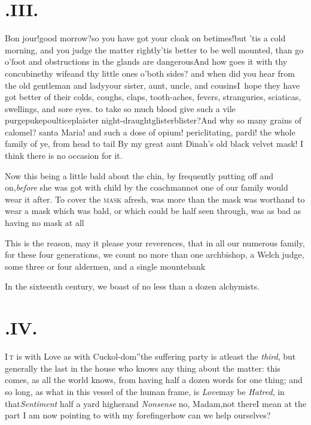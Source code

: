 \documentclass{article}
\begin{document}
\section{.\enspace III.}

\noindent\quad
\tsh Bon jour!\tsh good
morrow?\break\tsh so you have got your cloak on
betimes!\tsh but ’tis a cold morning, and you judge
the matter rightly\tsh ’tis better to be well
mounted, than go \hbox{o’\thinspace foot}\break
\tsh and obstructions in the
glands are dangerous\tsh And how goes it with thy
concubine\tsk thy wife\tsk and thy little ones o’\thinspace both
sides? and when did you hear from the old gentleman and
lady\tsk your sister, aunt, uncle, and cousins\tsk I~hope 
they have got better of their colds, coughs, claps,
tooth-aches, fevers, stranguries, sciaticas, swellings, and sore
eyes.
 to take so much blood\tsk
give such a vile purge\tsk puke\tsk poultice\tsk plaister\tsk
night-draught\tsk glister\tsk blister?\tsh And why so many
grains of calomel? santa Maria! and such a dose of opium!
periclitating, pardi! the whole family of ye, from head to tail\tsh 
By my great aunt Dinah’s old black velvet mask! I think
there is no occasion for it.

Now this being a little bald about the chin, by frequently
putting off and on,\break \textit{before} she was got with child by the
coachman\tsk not one of our family would wear it after. To cover
the \textsc{mask} afresh, was more than the mask was
worth\tsh and to wear a mask which was bald, or which
could be half seen through, was as bad as having no mask at
all\tsh

This is the reason, may it please your reverences, that in all
our numerous family, for these four generations, we count no more
than one archbishop, a Welch judge, some three or four
aldermen, and a single mountebank\tsh

In the sixteenth century, we boast of no less than a dozen
alchymists.

\vfill{}\eject
\section{.\enspace IV.}

\lettrine{\lower-10pt\hbox{\large \lqq}I}{\,t} is with Love as with
Cuckol-\break dom”\tsh the suffering party is at\break least the
\textit{third}, but generally the last in the house who knows any
thing about the matter: this comes, as all the world knows, from
having half a dozen words for one thing; and so long, as what in
this vessel of the human frame, is \textit{Love}\tsk may be
\textit{Hatred}, in that\tsh \textit{Sentiment}\break
half a yard higher\tsh and \textit{Nonsense}\tsh\break
\tsh\!\tsk no, Madam,\tsk not there\tsk I\break
mean at the part I am now
pointing to with my forefinger\tsh how can we help\break
ourselves?
\end{document}
